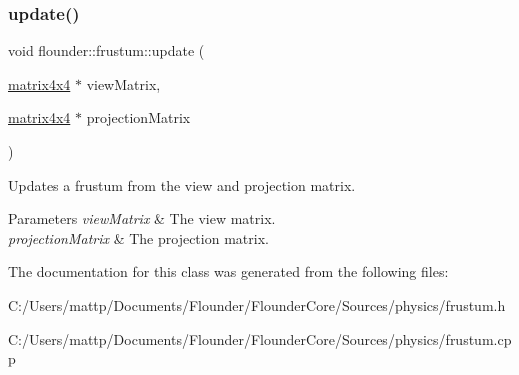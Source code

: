 \subsubsection{\texorpdfstring{update()}{update()}}
{\footnotesize\ttfamily void flounder\+::frustum\+::update (\begin{DoxyParamCaption}\item[{\hyperlink{classflounder_1_1matrix4x4}{matrix4x4} $\ast$}]{view\+Matrix,  }\item[{\hyperlink{classflounder_1_1matrix4x4}{matrix4x4} $\ast$}]{projection\+Matrix }\end{DoxyParamCaption})}



Updates a frustum from the view and projection matrix. 


\begin{DoxyParams}{Parameters}
{\em view\+Matrix} & The view matrix. \\
\hline
{\em projection\+Matrix} & The projection matrix. \\
\hline
\end{DoxyParams}


The documentation for this class was generated from the following files\+:\begin{DoxyCompactItemize}
\item 
C\+:/\+Users/mattp/\+Documents/\+Flounder/\+Flounder\+Core/\+Sources/physics/frustum.\+h\item 
C\+:/\+Users/mattp/\+Documents/\+Flounder/\+Flounder\+Core/\+Sources/physics/frustum.\+cpp\end{DoxyCompactItemize}
